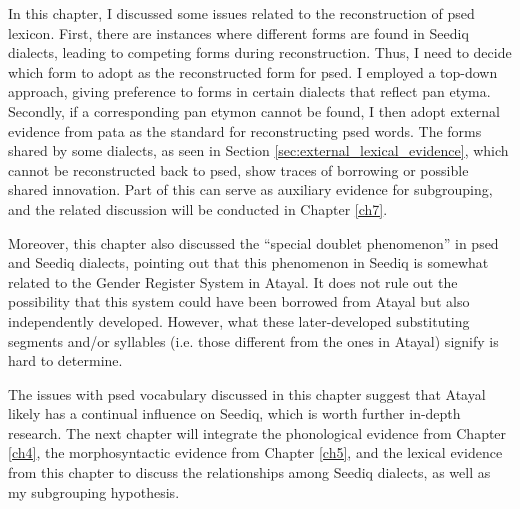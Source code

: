 

In this chapter, I discussed some issues related to the reconstruction of \acl{psed} lexicon. First, there are instances where different forms are found in Seediq dialects, leading to competing forms during reconstruction. Thus, I need to decide which form to adopt as the reconstructed form for \acl{psed}. I employed a top-down approach, giving preference to forms in certain dialects that reflect \acl{pan} etyma. Secondly, if a corresponding \acl{pan} etymon cannot be found, I then adopt external evidence from \acl{pata} as the standard for reconstructing \acl{psed} words. The forms shared by some dialects, as seen in Section \ref{sec:external_lexical_evidence}, which cannot be reconstructed back to \acl{psed}, show traces of borrowing or possible shared innovation. Part of this can serve as auxiliary evidence for subgrouping, and the related discussion will be conducted in Chapter \ref{ch7}.

Moreover, this chapter also discussed the ``special doublet phenomenon'' in \acl{psed} and Seediq dialects, pointing out that this phenomenon in Seediq is somewhat related to the Gender Register System in Atayal. It does not rule out the possibility that this system could have been borrowed from Atayal but also independently developed. However, what these later-developed substituting segments and/or syllables (i.e. those different from the ones in Atayal) signify is hard to determine.

The issues with \acl{psed} vocabulary discussed in this chapter suggest that Atayal likely has a continual influence on Seediq, which is worth further in-depth research. The next chapter will integrate the phonological evidence from Chapter \ref{ch4}, the morphosyntactic evidence from Chapter \ref{ch5}, and the lexical evidence from this chapter to discuss the relationships among Seediq dialects, as well as my subgrouping hypothesis.